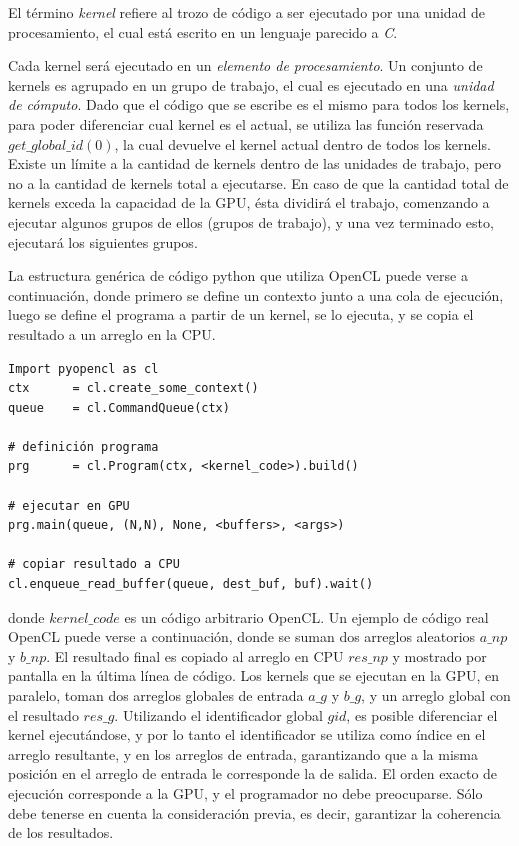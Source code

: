 El término {\em kernel} refiere al trozo de código a ser ejecutado por una unidad de procesamiento, el cual está escrito en un lenguaje parecido a {\em C}.

Cada kernel será ejecutado en un {\em elemento de procesamiento}.
Un conjunto de kernels es agrupado en un grupo de trabajo, el cual es ejecutado en una {\em unidad de cómputo}.
Dado que el código que se escribe es el mismo para todos los kernels, para poder diferenciar cual kernel es el actual, se utiliza las función reservada $get\_global\_id(0)$, la cual devuelve el kernel actual dentro de todos los kernels.
Existe un límite a la cantidad de kernels dentro de las unidades de trabajo, pero no a la cantidad de kernels total a ejecutarse.
En caso de que la cantidad total de kernels exceda la capacidad de la GPU, ésta dividirá el trabajo, comenzando a ejecutar algunos grupos de ellos (grupos de trabajo), y una vez terminado esto, ejecutará los siguientes grupos.


La estructura genérica de código python que utiliza OpenCL puede verse a continuación,
donde primero se define un contexto junto a una cola de ejecución, luego se define el programa a partir de un kernel, se lo ejecuta, y se copia el resultado a un arreglo en la CPU.

\begin{verbatim}
Import pyopencl as cl
ctx      = cl.create_some_context()
queue    = cl.CommandQueue(ctx)

# definición programa
prg      = cl.Program(ctx, <kernel_code>).build()

# ejecutar en GPU
prg.main(queue, (N,N), None, <buffers>, <args>) 

# copiar resultado a CPU
cl.enqueue_read_buffer(queue, dest_buf, buf).wait()
\end{verbatim}

donde $kernel\_code$ es un código arbitrario OpenCL.
Un ejemplo de código real OpenCL puede verse a continuación, donde se suman dos arreglos aleatorios $a\_{np}$ y $b\_{np}$. El resultado final es copiado al arreglo en CPU $res\_np$ y mostrado por pantalla en la última línea de código.
Los kernels que se ejecutan en la GPU, en paralelo, toman dos arreglos globales de entrada $a\_g$ y $b\_g$, y un arreglo global con el resultado $res\_g$.
Utilizando el identificador global $gid$, es posible diferenciar el kernel ejecutándose, y por lo tanto el identificador se utiliza como índice en el arreglo resultante, y en los arreglos de entrada, garantizando que a la misma posición en el arreglo de entrada le corresponde la de salida.
El orden exacto de ejecución corresponde a la GPU, y el programador no debe preocuparse.
Sólo debe tenerse en cuenta la consideración previa, es decir, garantizar la coherencia de los resultados.

